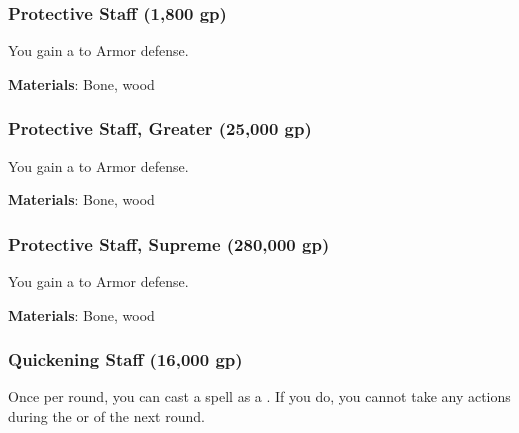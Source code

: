 \lowercase{\hypertarget{item:Protective Staff}{}}\label{item:Protective Staff}
\hypertarget{item:Protective Staff}{\subsubsection{Protective Staff\hfill{} (1,800 gp)}}

You gain a   to Armor defense.



\vspace{0.25em}
\textbf{Materials}: Bone, wood


\lowercase{\hypertarget{item:Protective Staff, Greater}{}}\label{item:Protective Staff, Greater}
\hypertarget{item:Protective Staff, Greater}{\subsubsection{Protective Staff, Greater\hfill{} (25,000 gp)}}

You gain a   to Armor defense.



\vspace{0.25em}
\textbf{Materials}: Bone, wood


\lowercase{\hypertarget{item:Protective Staff, Supreme}{}}\label{item:Protective Staff, Supreme}
\hypertarget{item:Protective Staff, Supreme}{\subsubsection{Protective Staff, Supreme\hfill{} (280,000 gp)}}

You gain a   to Armor defense.



\vspace{0.25em}
\textbf{Materials}: Bone, wood


\lowercase{\hypertarget{item:Quickening Staff}{}}\label{item:Quickening Staff}
\hypertarget{item:Quickening Staff}{\subsubsection{Quickening Staff\hfill{} (16,000 gp)}}

Once per round, you can cast a spell as a .
If you do, you cannot take any actions during the  or  of the next round.



